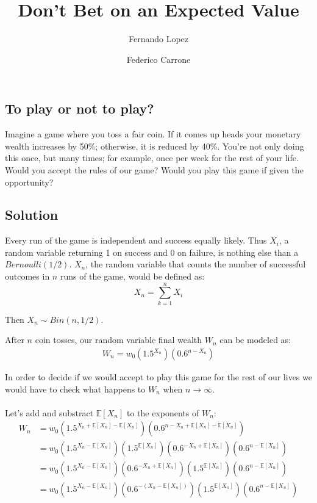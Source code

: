 \documentclass[12pt]{article}
\title{Don't Bet on an Expected Value}
\author{Fernando Lopez \and Federico Carrone}
\begin{document}
\maketitle
{}

\subsection{To play or not to play?}

Imagine a game where you toss a fair coin. If it comes up heads your monetary wealth increases by 50\%; otherwise, it is reduced by 40\%. You’re not only doing this once, but many times; for example, once per week for the rest of your life. Would you accept the rules of our game? Would you play this game if given the opportunity?

\subsection{Solution}
Every run of the game is independent and success equally likely. Thus $X_i$, a random variable returning 1 on success and 0 on failure, is nothing else than a $Bernoulli(1/2)$. $X_n$, the random variable that counts the number of successful outcomes in $n$ runs of the game, would be defined as:
\begin{equation*}
 X_n = \sum\limits_{k=1}^{n} X_i
\end{equation*}

Then $X_n \sim Bin(n, 1/2)$.

After $n$ coin tosses, our random variable final wealth $W_n$ can be modeled as:
\begin{align}
  \begin{equation*}
    W_n = w_0 \left(1.5^{X_n}\right)\left(0.6^{n-X_n}\right)
  \end{equation*}
\end{align}

In order to decide if we would accept to play this game for the rest of our lives we would have to check what happens to $W_n$ when $n \rightarrow \infty$.
\\\\

Let's add and substract $\mathbb{E}[X_n]$ to the exponents of $W_n$:
\begin{equation*}
  \begin{split}
      W_n &= w_0 \left(1.5^{X_n + \mathbb{E}[X_n] - \mathbb{E}[X_n]}\right) \left(0.6^{n - X_n + \mathbb{E}[X_n] - \mathbb{E}[X_n]}\right)\\
    &= w_0 \left(1.5^{X_n - \mathbb{E}[X_n]}\right) \left(1.5^{\mathbb{E}[X_n]}\right) \left(0.6^{- X_n + \mathbb{E}[X_n]}\right) \left(0.6^{n - \mathbb{E}[X_n]}\right)\\
    & = w_0 \left(1.5^{X_n - \mathbb{E}[X_n]}\right) \left(0.6^{- X_n + \mathbb{E}[X_n]}\right) \left(1.5^{\mathbb{E}[X_n]}\right) \left(0.6^{n - \mathbb{E}[X_n]}\right)\\
    & = w_0 \left(1.5^{X_n - \mathbb{E}[X_n]}\right) \left(0.6^{- (X_n - \mathbb{E}[X_n])}\right) \left(1.5^{\mathbb{E}[X_n]}\right) \left(0.6^{n - \mathbb{E}[X_n]}\right)
  \end{split}
\end{equation*}
\end{document}
